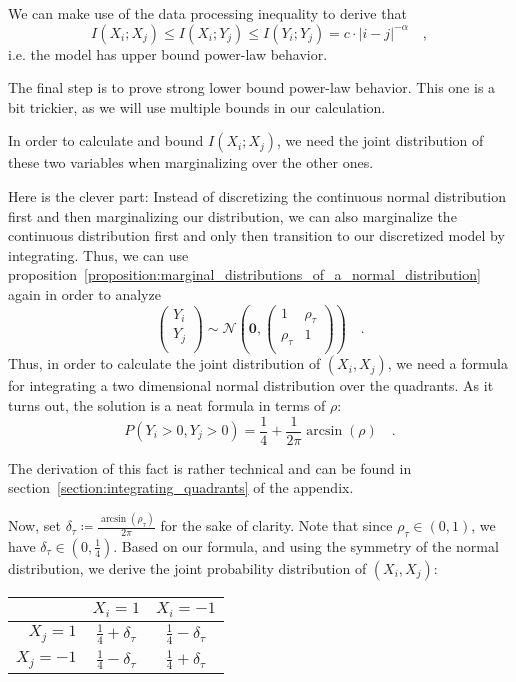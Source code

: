 \documentclass[../../main.tex]{subfiles}
\begin{document}
We can make use of the data processing inequality to derive that
\[
    I(X_i; X_j) \leq I(X_i; Y_j) \leq I(Y_i; Y_j) = c \cdot |i - j|^{-\alpha}\quad ,
\]
i.e. the model has upper bound power-law behavior.

\bigskip
The final step is to prove strong lower bound power-law behavior. This one is a bit trickier, as we will use multiple bounds in our calculation.
\bigskip

 In order to calculate and bound $I(X_i; X_j)$, we need the joint distribution of these two variables when marginalizing over the other ones.

Here is the clever part: Instead of discretizing the continuous normal distribution first and then marginalizing our distribution, we can also marginalize the continuous distribution first and only then transition to our discretized model by integrating. Thus, we can use proposition~\ref{proposition:marginal_distributions_of_a_normal_distribution} again in order to analyze
\[
    \begin{pmatrix*}
        Y_i \\
        Y_j \\
    \end{pmatrix*}
    \sim \mathcal{N}\left(\bm{0}, \begin{pmatrix*}
        1 & \rho_\tau \\
        \rho_\tau & 1 \\
    \end{pmatrix*}\right)
    \quad .
\]
Thus, in order to calculate the joint distribution of $(X_i, X_j)$, we need a formula for integrating a two dimensional normal distribution over the quadrants. As it turns out, the solution is a neat formula in terms of $\rho$:
\[
    P(Y_i>0, Y_j>0) = \frac{1}{4} + \frac{1}{2\pi}\arcsin(\rho) \quad .
\]

The derivation of this fact is rather technical and can be found in section~\ref{section:integrating_quadrants} of the appendix.

Now, set $\delta_\tau \coloneqq \frac{\arcsin(\rho_\tau)}{2\pi}$ for the sake of clarity. Note that since $\rho_\tau \in (0, 1)$, we have $\delta_\tau \in (0, \frac{1}{4})$. Based on our formula, and using the symmetry of the normal distribution, we derive the joint probability distribution of $(X_i, X_j)$:
\begin{table}[h]
    \centering
    \begin{tabular}{r|c|c}
        & $X_i = 1$ & $X_i = -1$ \\
        \hline
        \rule{0pt}{15pt} $X_j = 1$ & $\frac{1}{4} + \delta_\tau$ & $\frac{1}{4} - \delta_\tau$ \\
        \rule{0pt}{15pt} $X_j = -1$ & $\frac{1}{4} - \delta_\tau$ & $\frac{1}{4} + \delta_\tau$
    \end{tabular}
\end{table}
\end{document}

